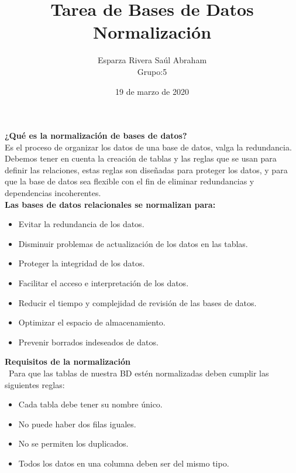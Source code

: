 \documentclass[12pt]{article}
\begin{document}
 
 
\title{Tarea de Bases de Datos\\Normalización}
\author{Esparza Rivera Saúl Abraham\\ Grupo:5}
\date {19 de marzo de 2020}
\maketitle

\textbf{¿Qué es la normalización de bases de datos?\\}
Es el proceso de organizar los datos de una base de datos, valga la redundancia. Debemos tener en cuenta la creación de tablas y las reglas que se usan para definir las relaciones, estas reglas son diseñadas para proteger los datos, y para que la base de datos sea flexible con el fin de eliminar redundancias y dependencias incoherentes.\\ 
 
\textbf{Las bases de datos relacionales se normalizan para:}
\begin{itemize}
\item Evitar la redundancia de los datos.
\item Disminuir problemas de actualización de los datos en las tablas.
\item Proteger la integridad de los datos.
\item Facilitar el acceso e interpretación de los datos.
\item Reducir el tiempo y complejidad de revisión de las bases de datos.
\item Optimizar el espacio de almacenamiento.
\item Prevenir borrados indeseados de datos.
\end{itemize}

\textbf{Requisitos de la normalización\\}
\ Para que las tablas de nuestra BD estén normalizadas deben cumplir las siguientes reglas:
\begin{itemize}
\item Cada tabla debe tener su nombre único.
\item No puede haber dos filas iguales.
\item No se permiten los duplicados.
\item Todos los datos en una columna deben ser del mismo tipo.
\end{itemize}
\end{document}
